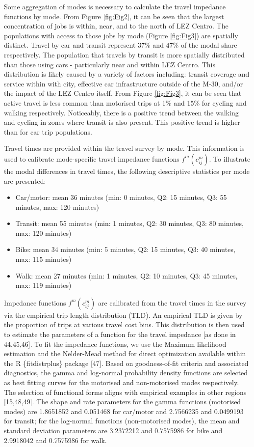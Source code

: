 \documentclass[10pt,letterpaper]{article}
\providecommand{\tightlist}{%
  \setlength{\itemsep}{0pt}\setlength{\parskip}{0pt}}
\begin{document}
Some aggregation of modes is necessary to calculate the travel impedance
functions by mode. From Figure \ref{fig:Fig2}, it can be seen that the
largest concentration of jobs is within, near, and to the north of LEZ
Centro. The populations with access to those jobs by mode (Figure
\ref{fig:Fig3}) are spatially distinct. Travel by car and transit
represent 37\% and 47\% of the modal share respectively. The population
that travels by transit is more spatially distributed than those using
cars - particularly near and within LEZ Centro. This distribution is
likely caused by a variety of factors including: transit coverage and
service within with city, effective car infrastructure outside of the
M-30, and/or the impact of the LEZ Centro itself. From Figure
\ref{fig:Fig3}, it can be seen that active travel is less common than
motorised trips at 1\% and 15\% for cycling and walking respectively.
Noticeably, there is a positive trend between the walking and cycling in
zones where transit is also present. This positive trend is higher than
for car trip populations.

Travel times are provided within the travel survey by mode. This
information is used to calibrate mode-specific travel impedance
functions \(f^m(c_{ij}^m)\). To illustrate the modal differences in
travel times, the following descriptive statistics per mode are
presented:

\begin{itemize}
\tightlist
\item
  Car/motor: mean 36 minutes (min: 0 minutes, Q2: 15 minutes, Q3: 55
  minutes, max: 120 minutes)
\item
  Transit: mean 55 minutes (min: 1 minutes, Q2: 30 minutes, Q3: 80
  minutes, max: 120 minutes)
\item
  Bike: mean 34 minutes (min: 5 minutes, Q2: 15 minutes, Q3: 40 minutes,
  max: 115 minutes)
\item
  Walk: mean 27 minutes (min: 1 minutes, Q2: 10 minutes, Q3: 45 minutes,
  max: 119 minutes)
\end{itemize}

Impedance functions \(f^m(c_{ij}^m)\) are calibrated from the travel
times in the survey via the empirical trip length distribution (TLD). An
empirical TLD is given by the proportion of trips at various travel cost
bins. This distribution is then used to estimate the parameters of a
function for the travel impedance {[}as done in 44,45,46{]}. To fit the
impedance functions, we use the Maximum likelihood estimation and the
Nelder-Mead method for direct optimization available within the R
\{fitdistrplus\} package {[}47{]}. Based on goodness-of-fit criteria and
associated diagnostics, the gamma and log-normal probability density
functions are selected as best fitting curves for the motorised and
non-motorised modes respectively. The selection of functional forms
aligns with empirical examples in other regions {[}15,48,49{]}. The
shape and rate parameters for the gamma functions (motorised modes) are
1.8651852 and 0.051468 for car/motor and 2.7566235 and 0.0499193 for
transit; for the log-normal functions (non-motorised modes), the mean
and standard deviation parameters are 3.2372212 and 0.7575986 for bike
and 2.9918042 and 0.7575986 for walk.
\end{document}
